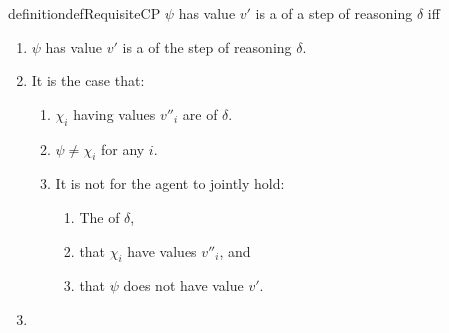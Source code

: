 \begin{note}
  \begin{restatable}{definition}{defRequisiteCP}
    \label{def:cprequ}
    \(\psi\) has value \(v'\) is a \emph{} of a step of reasoning \(\delta\) iff
    \begin{enumerate}[label=\arabic*., ref=\named{cpR:\arabic*}]
    \item
      \label{def:cprequ:result}
      \(\psi\) has value \(v'\) is a  of the step of reasoning \(\delta\).
    \item It is the case that:
      \label{def:cprequ:subjunctive}
      \begin{enumerate}[label=\alph*., ref=\named{cpR:2\alph*}]
      \item
        \label{def:cprequ:subjunctive:chi}
        \(\chi_{i}\) having values \(v''_{i}\) are  of \(\delta\).
      \item
        \label{def:cprequ:subjunctive:unique}
        \(\psi \ne \chi_{i}\) for any \(i\).
      \item
        \label{def:cprequ:subjunctive:relation}
        It is not \epAdv{} for the agent to jointly hold:
          \begin{enumerate}
          \item
            The  of \(\delta\),
          \item
            that \(\chi_{i}\) have values \(v''_{i}\), and
          \item
            that \(\psi\) does not have value \(v'\).
          \end{enumerate}
      \end{enumerate}
    \item
      \requGlobalClause{}
    \end{enumerate}
    \vspace{-\baselineskip}
  \end{restatable}
\end{note}

